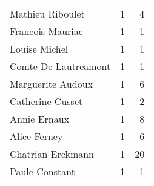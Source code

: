 \begin{xltabular}{\textwidth}{lrr}
                    Mathieu Riboulet &          1 &                4 \\
                    Francois Mauriac &          1 &                1 \\
                       Louise Michel &          1 &                1 \\
                Comte De Lautreamont &          1 &                1 \\
                   Marguerite Audoux &          1 &                6 \\
                    Catherine Cusset &          1 &                2 \\
                        Annie Ernaux &          1 &                8 \\
                        Alice Ferney &          1 &                6 \\
                   Chatrian Erckmann &          1 &               20 \\
                      Paule Constant &          1 &                1 \\
\bottomrule

\end{xltabular}


\newpage


